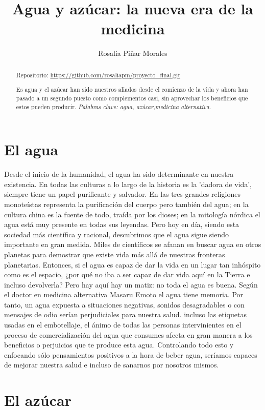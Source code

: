 \documentclass{article}
\title{Agua y azúcar: la nueva era de la medicina}
\author{Rosalia Piñar Morales}
\begin{document}
\maketitle
\begin{abstract} 

	Repositorio: \url{https://github.com/rosaliapm/proyecto_final.git}
	
	Es agua y el azúcar han sido nuestros aliados desde el comienzo de la vida y ahora han pasado a un segundo puesto como complementos casi, sin aprovechar los beneficios que estos pueden producir. 
	\textit{Palabras clave: agua, azúcar,medicina alternativa.}
	 
\end{abstract}

\section{El agua}

	Desde el inicio de la humanidad, el agua ha sido determinante en nuestra existencia. En todas las culturas a lo largo de la historia es la 'dadora de vida', siempre tiene un papel purificante y salvador. En las tres grandes religiones monoteístas representa la purificación del cuerpo pero también del agua; en la cultura china es la fuente de todo, traída por los dioses; en la mitología nórdica el agua está muy presente en todas sus leyendas.
	Pero hoy en día, siendo esta sociedad más científica y racional, descubrimos que el agua sigue siendo importante en gran medida. Miles de científicos se afanan en buscar agua en otros planetas para demostrar que existe vida más allá de nuestras fronteras planetarias. Entonces, si el agua es capaz de dar la vida en un lugar tan inhóspito como es el espacio, ¿por qué no iba a ser capaz de dar vida aquí en la Tierra e incluso devolverla?
	Pero hay aquí hay un matiz: no toda el agua es buena. Según el doctor en medicina alternativa Masaru Emoto el agua tiene memoria. Por tanto, un agua expuesta a situaciones negativas, sonidos desagradables o con mensajes de odio serían perjudiciales para nuestra salud. incluso las etiquetas usadas en el embotellaje, el ánimo de todas las personas intervinientes en el proceso de comercialización del agua que consumes afecta en gran manera a los beneficios o perjuicios que te produce esta agua. Controlando todo esto y enfocando sólo pensamientos positivos a la hora de beber agua, seríamos capaces de mejorar nuestra salud e incluso de sanarnos por nosotros mismos.
	
\section{El azúcar}
	
\end{document}
